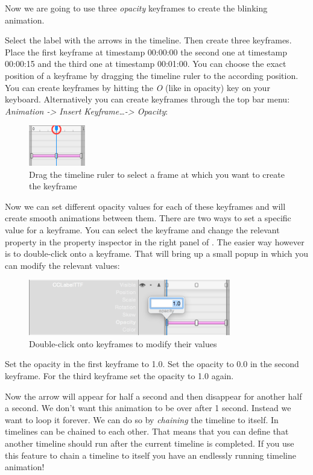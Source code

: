 Now we are going to use three \textit{opacity} keyframes to create the blinking
animation. 
\begin{leftbar}
Select the label with the arrows in the timeline. Then create three
keyframes. Place the first keyframe
at timestamp 00:00:00 the second one at timestamp 00:00:15 and the third
one at timestamp 00:01:00. You can choose the exact position of a
keyframe by dragging the timeline ruler to the according position. You can create keyframes by hitting the
\textit{O} (like in opacity) key on your keyboard. Alternatively you can create
keyframes through the top bar menu:
\textit{Animation -> Insert Keyframe\ldots -> Opacity}:
\begin{figure}[H]
\centering
\includegraphics[width=70pt]{images/Chapter7/timeline_ruler.png}
\caption{Drag the timeline ruler to select a frame at which you want to create
the keyframe}
\end{figure}
\end{leftbar}

Now we can set different opacity values for each of these keyframes and \SB{}
will create smooth animations between them. There are two ways to set a
specific value for a keyframe. You can select the keyframe and change the
relevant property in the property inspector in the right panel of \SB{}. The
easier way however is to double-click onto a keyframe. That will bring up a
small popup in which you can modify the relevant values:
\begin{figure}[H]
\centering
\includegraphics[width=250pt]{images/Chapter7/edit_keyframe.png}
\caption{Double-click onto keyframes to modify their values}
\end{figure}

\begin{leftbar}
Set the opacity in the first keyframe to 1.0. Set the opacity to 0.0 in the
second keyframe. For the third keyframe set the opacity to 1.0 again.
\end{leftbar}

Now the arrow will appear for half a second and then disappear for another half
a second. We don't want this animation to be over after 1 second. Instead we
want to loop it forever. We can do so by \textit{chaining} the timeline to itself. In \SB{} timelines can be chained to
each other. That means that you can define that another timeline should run
after the current timeline is completed. If you use this feature to chain a
timeline to itself you have an endlessly running timeline animation!

